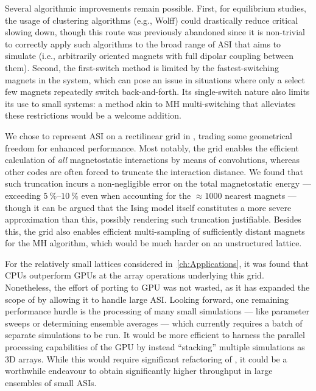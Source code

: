 Several algorithmic improvements remain possible.
First, for equilibrium studies, the usage of clustering algorithms (e.g., Wolff) could drastically reduce critical slowing down, though this route was previously abandoned since it is non-trivial to correctly apply such algorithms to the broad range of ASI that \hotspice aims to simulate (i.e., arbitrarily oriented magnets with full dipolar coupling between them).
Second, the first-switch method is limited by the fastest-switching magnets in the system, which can pose an issue in situations where only a select few magnets repeatedly switch back-and-forth.
Its single-switch nature also limits its use to small systems: a method akin to MH multi-switching that alleviates these restrictions would be a welcome addition. \par
We chose to represent ASI on a rectilinear grid in \hotspice, trading some geometrical freedom for enhanced performance. %
Most notably, the grid enables the efficient calculation of \textit{all} magnetostatic interactions by means of convolutions, whereas other codes are often forced to truncate the interaction distance.
We found that such truncation incurs a non-negligible error on the total magnetostatic energy --- exceeding $\SIrange{5}{10}{\percent}$ even when accounting for the $\approx 1000$ nearest magnets --- though it can be argued that the Ising model itself constitutes a more severe approximation than this, possibly rendering such truncation justifiable.
Besides this, the grid also enables efficient multi-sampling of sufficiently distant magnets for the MH algorithm, which would be much harder on an unstructured lattice. \par
For the relatively small lattices considered in~\cref{ch:Applications}, it was found that CPUs outperform GPUs at the array operations underlying this grid. %
Nonetheless, the effort of porting \hotspice to GPU was not wasted, as it has expanded the scope of \hotspice by allowing it to handle large ASI.
Looking forward, one remaining performance hurdle is the processing of many small simulations --- like parameter sweeps or determining ensemble averages --- which currently requires a batch of separate simulations to be run.
It would be more efficient to harness the parallel processing capabilities of the GPU by instead ``stacking'' multiple simulations as 3D arrays.
While this would require significant refactoring of \hotspice, it could be a worthwhile endeavour to obtain significantly higher throughput in large ensembles of small ASIs.

